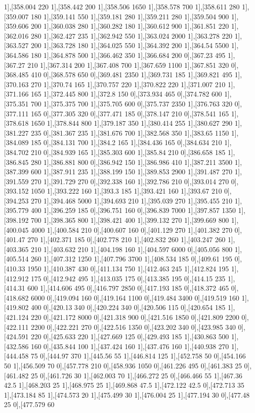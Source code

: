 {1],[358.004 220 1],[358.442 200 1],[358.506 1650 1],[358.578 700 1],[358.611 280 1],[359.007 180 1],[359.141 550 1],[359.181 280 1],[359.211 280 1],[359.504 900 1],[359.606 200 1],[360.038 280 1],[360.282 180 1],[360.612 900 1],[361.851 220 1],[362.016 280 1],[362.427 235 1],[362.942 550 1],[363.024 2000 1],[363.278 220 1],[363.527 200 1],[363.728 180 1],[364.025 550 1],[364.392 200 1],[364.54 5500 1],[364.586 180 1],[364.878 500 1],[366.462 350 1],[366.684 200 0],[367.23 495 1],[367.27 210 1],[367.314 200 1],[367.408 700 1],[367.659 1100 1],[367.851 320 0],[368.485 410 0],[368.578 650 0],[369.481 2350 1],[369.731 185 1],[369.821 495 1],[370.163 270 1],[370.74 165 1],[370.757 220 1],[370.822 220 1],[371.007 210 1],[371.166 165 1],[372.445 800 1],[372.8 150 0],[373.934 465 0],[374.782 600 1],[375.351 700 1],[375.375 700 1],[375.705 600 0],[375.737 2350 1],[376.763 320 0],[377.111 165 0],[377.305 320 0],[377.471 185 0],[378.147 210 0],[378.541 165 1],[378.618 1650 1],[378.844 800 1],[379.187 350 1],[380.414 255 1],[380.627 290 1],[381.227 235 0],[381.367 235 1],[381.676 700 1],[382.568 350 1],[383.65 1150 1],[384.089 185 0],[384.131 700 1],[384.2 165 1],[384.436 165 0],[384.634 210 1],[384.702 210 0],[384.939 165 1],[385.303 600 1],[385.84 210 0],[386.658 185 1],[386.845 280 1],[386.881 800 0],[386.942 150 1],[386.986 410 1],[387.211 3500 1],[387.399 600 1],[387.911 235 1],[388.199 150 1],[389.853 2900 1],[391.487 270 1],[391.559 270 1],[391.729 270 0],[392.338 160 1],[392.786 210 0],[393.014 270 0],[393.152 1050 1],[393.222 160 1],[393.3 185 1],[393.421 160 1],[393.67 210 0],[394.253 270 1],[394.468 5000 1],[394.693 210 1],[395.039 270 1],[395.455 210 1],[395.779 400 1],[396.259 185 0],[396.751 160 0],[396.839 7000 1],[397.857 1350 1],[398.192 700 1],[398.365 800 1],[398.421 400 1],[399.132 270 1],[399.669 800 1],[400.045 4000 1],[400.584 210 0],[400.607 160 0],[401.129 270 1],[401.382 270 0],[401.47 270 1],[402.371 185 0],[402.778 210 1],[402.832 260 1],[403.247 260 1],[403.365 210 1],[403.632 210 1],[404.198 160 1],[404.597 6000 0],[405.056 800 1],[405.514 260 1],[407.312 1250 1],[407.796 3700 1],[408.534 185 0],[409.61 195 0],[410.33 1950 1],[410.387 430 0],[411.134 750 1],[412.463 245 1],[412.824 195 1],[412.912 175 0],[412.942 495 1],[413.035 175 0],[413.385 195 0],[414.15 235 1],[414.31 600 1],[414.606 495 0],[416.797 2850 0],[417.193 185 0],[418.372 465 0],[418.682 6000 0],[419.094 160 0],[419.164 1100 0],[419.484 3400 0],[419.519 160 1],[419.802 400 0],[420.13 340 0],[420.224 340 0],[420.506 115 0],[420.654 185 1],[421.124 220 0],[421.172 8000 0],[421.318 900 0],[421.516 1850 0],[421.809 2200 0],[422.111 2200 0],[422.221 270 0],[422.516 1350 0],[423.202 340 0],[423.985 340 0],[424.591 220 0],[425.633 220 1],[427.669 125 0],[429.493 185 1],[430.863 500 1],[432.586 160 0],[435.844 100 1],[437.424 160 1],[437.476 160 1],[440.938 270 1],[444.458 75 0],[444.97 370 1],[445.56 55 1],[446.814 125 1],[452.758 50 0],[454.166 50 1],[456.509 70 0],[457.778 210 0],[458.936 1050 0],[461.226 495 0],[461.383 25 0],[461.482 25 0],[461.726 30 1],[462.003 70 1],[466.272 25 0],[466.466 55 1],[467.36 42.5 1],[468.203 25 1],[468.975 25 1],[469.868 47.5 1],[472.122 42.5 0],[472.713 35 1],[473.184 85 1],[474.573 20 1],[475.499 30 1],[476.004 25 1],[477.194 30 0],[477.48 25 0],[477.579 60 }
